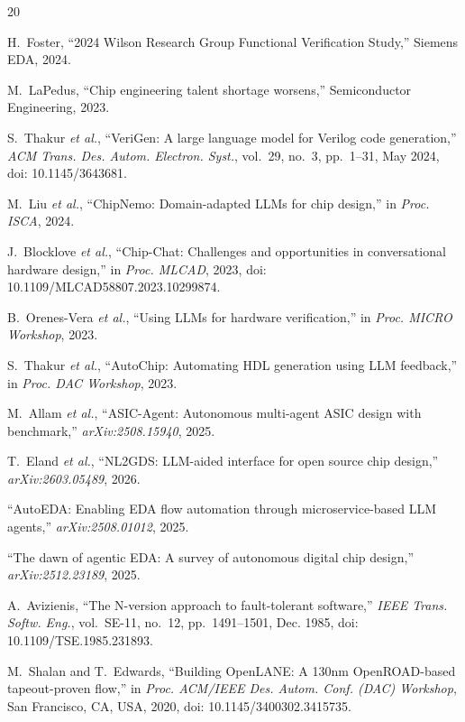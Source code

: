 \documentclass[journal]{IEEEtran}
\begin{document}
\begin{thebibliography}{20}

 H.~Foster, ``2024 Wilson Research Group Functional Verification Study,'' Siemens EDA, 2024.

 M.~LaPedus, ``Chip engineering talent shortage worsens,'' Semiconductor Engineering, 2023.

 S.~Thakur \emph{et al.}, ``VeriGen: A large language model for Verilog code generation,'' \emph{ACM Trans. Des. Autom. Electron. Syst.}, vol.~29, no.~3, pp.~1--31, May 2024, doi: 10.1145/3643681.

 M.~Liu \emph{et al.}, ``ChipNemo: Domain-adapted LLMs for chip design,'' in \emph{Proc. ISCA}, 2024.

 J.~Blocklove \emph{et al.}, ``Chip-Chat: Challenges and opportunities in conversational hardware design,'' in \emph{Proc. MLCAD}, 2023, doi: 10.1109/MLCAD58807.2023.10299874.

 B.~Orenes-Vera \emph{et al.}, ``Using LLMs for hardware verification,'' in \emph{Proc. MICRO Workshop}, 2023.

 S.~Thakur \emph{et al.}, ``AutoChip: Automating HDL generation using LLM feedback,'' in \emph{Proc. DAC Workshop}, 2023.

 M.~Allam \emph{et al.}, ``ASIC-Agent: Autonomous multi-agent ASIC design with benchmark,'' \emph{arXiv:2508.15940}, 2025.

 T.~Eland \emph{et al.}, ``NL2GDS: LLM-aided interface for open source chip design,'' \emph{arXiv:2603.05489}, 2026.

 ``AutoEDA: Enabling EDA flow automation through microservice-based LLM agents,'' \emph{arXiv:2508.01012}, 2025.

 ``The dawn of agentic EDA: A survey of autonomous digital chip design,'' \emph{arXiv:2512.23189}, 2025.

 A.~Avizienis, ``The N-version approach to fault-tolerant software,'' \emph{IEEE Trans. Softw. Eng.}, vol.~SE-11, no.~12, pp.~1491--1501, Dec. 1985, doi: 10.1109/TSE.1985.231893.

 M.~Shalan and T.~Edwards, ``Building OpenLANE: A 130nm OpenROAD-based tapeout-proven flow,'' in \emph{Proc. ACM/IEEE Des. Autom. Conf. (DAC) Workshop}, San Francisco, CA, USA, 2020, doi: 10.1145/3400302.3415735.


\end{thebibliography}
\end{document}
